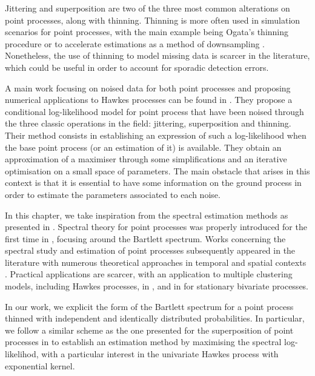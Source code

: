 Jittering and superposition are two of the three most common alterations on point processes, along with thinning.
Thinning is more often used in simulation scenarios for point processes, 
with the main example being Ogata's thinning procedure \parencite{Ogata1981} or to accelerate estimations as a method of downsampling \parencite{Li2019}.
Nonetheless, the use of thinning to model missing data is scarcer in the literature, 
which could be useful in order to account for sporadic detection errors.

A main work focusing on noised data for both point processes and proposing numerical applications to Hawkes processes can be found in \textcite{Lund2000}. 
They propose a conditional log-likelihood model for point process that have been noised through the three classic operations in the field: jittering, superposition and thinning. 
Their method consists in establishing an expression of such a log-likelihood when the base point process (or an estimation of it) is available.
They obtain an approximation of a maximiser through some simplifications and an iterative optimisation on a small space of parameters.
The main obstacle that arises in this context is that it is essential to have some information on the ground process in order to estimate the parameters associated to each noise.

In this chapter, we take inspiration from the spectral estimation methods as presented in \textcite{Cheysson2022, Bonnet2024}.
Spectral theory for point processes was properly introduced for the first time in \textcite{Bartlett1963},
focusing around the Bartlett spectrum. 
Works concerning the spectral study and estimation of point processes subsequently appeared in the literature with numerous theoretical approaches in temporal and spatial contexts \parencite{Daley1971, Tuan1981, Mugglestone2001, Rajala2023}. Practical applications are scarcer, with an application to multiple clustering models, including Hawkes processes, in \textcite{Adamopoulos1976}, and in \textcite{Karavasilis2007} for stationary bivariate processes.

In our work, we explicit the form of the Bartlett spectrum for a point process thinned with independent and identically distributed probabilities. In particular, we follow a similar scheme as the one presented for the superposition of point processes in \textcite{Bonnet2024} to establish an estimation method by maximising the spectral log-likelihod, with a particular interest in the univariate Hawkes process with exponential kernel.

